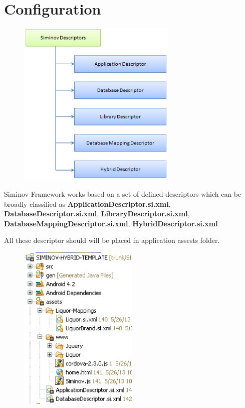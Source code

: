\newpage
\chapter {\Large{Configuration}}

\begin{figure}[htbp]
	\centering
		\includegraphics[height=8cm]{Resources/siminov_descriptors.png}
\end{figure}

\par
Siminov Framework works based on a set of defined descriptors which can be broadly classified as \textbf{ApplicationDescriptor.si.xml}, \textbf{DatabaseDescriptor.si.xml}, \textbf{LibraryDescriptor.si.xml}, \textbf{DatabaseMappingDescriptor.si.xml}, \textbf{HybridDescriptor.si.xml}

\par
All these descriptor should will be placed in application assests folder. 

\newpage
\begin{figure}[!htbp]
	\centering
		\includegraphics[height=8cm]{Resources/application_assests_structure.png}
\end{figure}


